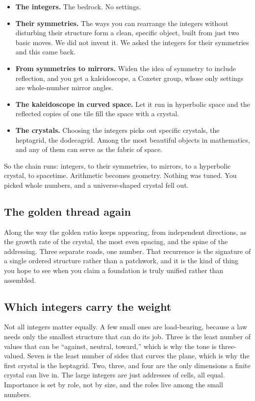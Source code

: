 \begin{itemize}
\item \textbf{The integers.} The bedrock. No settings.
\item \textbf{Their symmetries.} The ways you can rearrange the integers without disturbing their structure form a clean, specific object, built from just two basic moves. We did not invent it. We asked the integers for their symmetries and this came back.
\item \textbf{From symmetries to mirrors.} Widen the idea of symmetry to include reflection, and you get a kaleidoscope, a Coxeter group, whose only settings are whole-number mirror angles.
\item \textbf{The kaleidoscope in curved space.} Let it run in hyperbolic space and the reflected copies of one tile fill the space with a crystal.
\item \textbf{The crystals.} Choosing the integers picks out specific crystals, the heptagrid, the dodecagrid. Among the most beautiful objects in mathematics, and any of them can serve as the fabric of space.
\end{itemize}

So the chain runs: integers, to their symmetries, to mirrors, to a hyperbolic crystal, to spacetime. Arithmetic becomes geometry. Nothing was tuned. You picked whole numbers, and a universe-shaped crystal fell out.

\subsection{The golden thread again}

Along the way the golden ratio keeps appearing, from independent directions, as the growth rate of the crystal, the most even spacing, and the spine of the addressing. Three separate roads, one number. That recurrence is the signature of a single ordered structure rather than a patchwork, and it is the kind of thing you hope to see when you claim a foundation is truly unified rather than assembled.

\subsection{Which integers carry the weight}

Not all integers matter equally. A few small ones are load-bearing, because a law needs only the smallest structure that can do its job. Three is the least number of values that can be ``against, neutral, toward,'' which is why the tone is three-valued. Seven is the least number of sides that curves the plane, which is why the first crystal is the heptagrid. Two, three, and four are the only dimensions a finite crystal can live in. The large integers are just addresses of cells, all equal. Importance is set by role, not by size, and the roles live among the small numbers.

